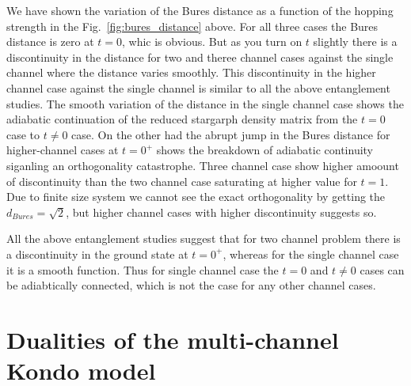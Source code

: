 \documentclass[reprint,prb,superscriptaddress]{revtex4-2}
\begin{document}
We have shown the variation of the Bures distance as a function of the hopping strength in the Fig.~\ref{fig:bures_distance} above. For all three cases the Bures distance is zero at $t=0$, whic is obvious. But as you turn on $t$ slightly there is a discontinuity in the distance for two and theree channel cases against the single channel where the distance varies smoothly. This discontinuity in the higher channel case against the single channel is similar to all the above entanglement studies. The smooth variation of the distance in the single channel case shows the adiabatic continuation of the reduced stargarph density matrix from the $t=0$ case to $t\neq 0$ case. On the other had the abrupt jump in the Bures distance for higher-channel cases at $t=0^+$ shows the breakdown of adiabatic continuity siganling an orthogonality catastrophe. Three channel case show higher amoount of discontinuity than the two channel case saturating at higher value for $t=1$. Due to finite size system we cannot see the exact orthogonality by getting the $d_{Bures}=\sqrt{2}$, but higher channel cases with higher discontinuity suggests so.

\par All the above  entanglement studies suggest that for two channel problem there is a discontinuity in the ground state at $t=0^{+}$, whereas for the single channel case it is a smooth function. Thus for single channel case the $t=0$ and $t\neq 0$ cases can be adiabtically connected, which is not the case for any other channel cases. 

\section{Dualities of the multi-channel Kondo model}
\label{sec:duality}
\end{document}
